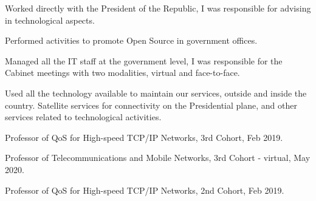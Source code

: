\documentclass[]{plushcv}
\begin{document}
\begin{minipage}[t]{0.70\textwidth}
\begin{tightemize}
\sectionsep
\item Worked directly with the President of the Republic, I was responsible for advising in technological aspects.
\item Performed activities to promote Open Source in government offices.
\item Managed all the IT staff at the government level, I was responsible for the Cabinet meetings with two modalities, virtual and face-to-face.
\item Used all the technology available to maintain our services, outside and inside the country. Satellite services for connectivity on the Presidential plane, and other services related to technological activities.
\end{tightemize}
\sectionsep

\vspace{\topsep} %
\begin{tightemize}
	\sectionsep
	\item Professor of QoS for High-speed TCP/IP Networks, 3rd Cohort, Feb 2019.
	\item Professor of Telecommunications and Mobile Networks, 3rd Cohort - virtual, May 2020.
	\item Professor of QoS for High-speed TCP/IP Networks, 2nd Cohort, Feb 2019.
\end{tightemize}
\sectionsep


%
%

\end{minipage} 
\end{document}
